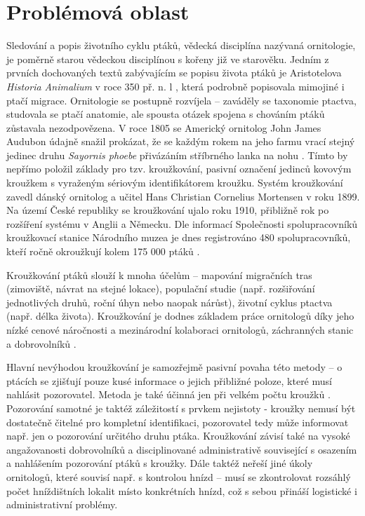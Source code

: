 
\chapter{Problémová oblast}{\tiny }

Sledování a popis životního cyklu ptáků, vědecká disciplína nazývaná ornitologie, je poměrně starou vědeckou disciplínou s kořeny již ve starověku. Jedním z prvních dochovaných textů zabývajícím se popisu života ptáků je Aristotelova \emph{Historia Animalium} v roce 350 př. n. l \cite{historiaAnimalium}, která podrobně popisovala mimojiné i ptačí migrace. Ornitologie se postupně rozvíjela -- zaváděly se taxonomie ptactva, studovala se ptačí anatomie, ale spousta otázek spojena s chováním ptáků zůstavala nezodpovězena. V roce 1805 se Americký ornitolog John James Audubon údajně snažil prokázat, že se každým rokem na jeho farmu vrací stejný jedinec druhu \emph{Sayornis phoebe} přivázáním stříbrného lanka na nohu \cite{halley2018audubon}. Tímto by nepřímo položil základy pro tzv. kroužkování, pasivní označení jedinců kovovým kroužkem s vyraženým sériovým identifikátorem kroužku. Systém kroužkování zavedl dánský ornitolog a učitel Hans Christian Cornelius Mortensen v roku 1899. Na území České republiky se kroužkování ujalo roku 1910, přibližně rok po rozšíření systému v Anglii a Německu. Dle informací Společnosti spolupracovníků kroužkovací stanice Národního muzea je dnes registrováno 480 spolupracovníků, kteří ročně okroužkují kolem 175 000 ptáků \cite{krouzkovaniPtakuHistorie}.

Kroužkování ptáků slouží k mnoha účelům -- mapování migračních tras (zimoviště, návrat na stejné lokace), populační studie (např. rozšiřování jednotlivých druhů, roční úhyn nebo naopak nárůst), životní cyklus ptactva (např. délka života). Kroužkování je dodnes základem práce ornitologů díky jeho nízké cenové náročnosti a mezinárodní kolaboraci ornitologů, záchranných stanic a dobrovolníků \cite{krouzkovaniPtaku}. 

Hlavní nevýhodou kroužkování je samozřejmě pasivní povaha této metody -- o ptácích se zjišťují pouze kusé informace o jejich přibližné poloze, které musí nahlásit pozorovatel. Metoda je také účinná jen při velkém počtu kroužků \cite{sokolov2011modern}. Pozorování samotné je taktéž záležitostí s prvkem nejistoty - kroužky nemusí být dostatečně čitelné pro kompletní identifikaci, pozorovatel tedy může informovat např. jen o pozorování určitého druhu ptáka. Kroužkování závisí také na vysoké angažovanosti dobrovolníků a disciplinované administrativě související s osazením a nahlášením pozorování ptáků s kroužky. Dále taktéž neřeší jiné úkoly ornitologů, které souvisí např. s kontrolou hnízd -- musí se zkontrolovat rozsáhlý počet hníždištních lokalit místo konkrétních hnízd, což s sebou přináší logistické i administrativní problémy.

